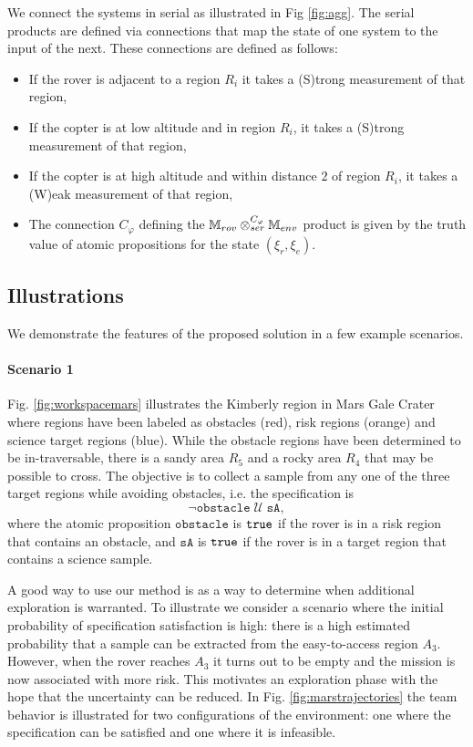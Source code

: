 \documentclass[conference]{IEEEtran}
\begin{document}
We connect the systems in serial as illustrated in Fig \ref{fig:agg}. The serial products are defined via connections that map the state of one system to the input of the next. These connections are defined as follows:
\begin{itemize}
  \item If the rover is adjacent to a region $R_i$ it takes a (S)trong measurement of that region,
  \item If the copter is at low altitude and in region $R_i$, it takes a (S)trong measurement of that region,
  \item If the copter is at high altitude and within distance $2$ of region $R_i$, it takes a (W)eak measurement of that region,
  \item The connection $C_\varphi$ defining the $\mathbb{M}_{rov} \otimes_{ser}^{C_\varphi} \mathbb{M}_{env}$ product is given by the truth value of atomic propositions for the state $(\xi_r, \xi_e)$.
\end{itemize}


\subsection{Illustrations}

We demonstrate the features of the proposed solution in a few example scenarios.

\paragraph{Scenario 1} Fig. \ref{fig:workspacemars} illustrates the Kimberly region in Mars Gale Crater where regions have been labeled as obstacles (red), risk regions (orange) and science target regions (blue). While the obstacle regions have been determined to be in-traversable, there is a sandy area $R_5$ and a rocky area $R_4$ that may be possible to cross. The objective is to collect a sample from any one of the three target regions while avoiding obstacles, i.e. the specification is
\begin{equation}
  \lnot \texttt{obstacle} \; \mathcal U \; \texttt{sA},
\end{equation}
where the atomic proposition $\texttt{obstacle}$ is $\texttt{true}$ if the rover is in a risk region that contains an obstacle, and $\texttt{sA}$ is $\texttt{true}$ if the rover is in a target region that contains a science sample.

A good way to use our method is as a way to determine when additional exploration is warranted. To illustrate we consider a scenario where the initial probability of specification satisfaction is high: there is a high estimated probability that a sample can be extracted from the easy-to-access region $A_3$. However, when the rover reaches $A_3$ it turns out to be empty and the mission is now associated with more risk. This motivates an exploration phase with the hope that the uncertainty can be reduced. In Fig. \ref{fig:marstrajectories} the team behavior is illustrated for two configurations of the environment: one where the specification can be satisfied and one where it is infeasible.
\end{document}
